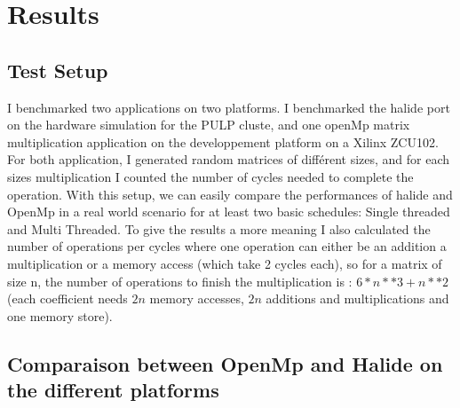 
\chapter{Results}
\section{Test Setup}
	I benchmarked two applications on two platforms. I benchmarked the halide port  on the hardware simulation for the PULP cluste, and one openMp matrix multiplication application on the developpement platform on a Xilinx ZCU102. For both application, I generated random matrices of différent sizes, and for each sizes multiplication I counted the number of cycles needed to complete the operation. 
	With this setup, we can easily compare the performances of halide and OpenMp in a real world scenario for at least two basic schedules: Single threaded and Multi Threaded.
	To give the results a more meaning I also calculated the number of operations per cycles where one operation can either be an addition a multiplication or a memory access (which take 2 cycles each), so for a matrix of size n, the number of operations to finish the multiplication is : $6 * n ** 3 + n ** 2$ (each coefficient needs $2n$ memory accesses, $2n$ additions and multiplications and one memory store).

\section{Comparaison between OpenMp and Halide on the different platforms}
